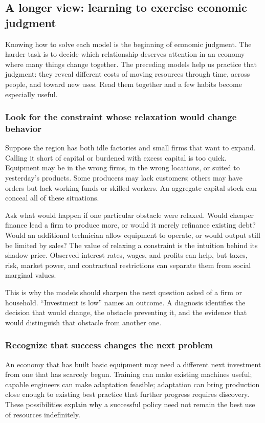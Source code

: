 \subsection{A longer view: learning to exercise economic judgment}
\label{sec:growth-judgment}

Knowing how to solve each model is the beginning of economic judgment.
The harder task is to decide which relationship deserves attention in an
economy where many things change together. The preceding models help us
practice that judgment: they reveal different costs of moving resources
through time, across people, and toward new uses. Read them together and
a few habits become especially useful.

\subsubsection{Look for the constraint whose relaxation would change behavior}

Suppose the region has both idle factories and small firms that want to
expand. Calling it short of capital or burdened with excess capital is too
quick. Equipment may be in the wrong firms, in the wrong locations, or
suited to yesterday's products. Some producers may lack customers; others
may have orders but lack working funds or skilled workers. An aggregate
capital stock can conceal all of these situations.

Ask what would happen if one particular obstacle were relaxed. Would
cheaper finance lead a firm to produce more, or would it merely refinance
existing debt? Would an additional technician allow equipment to operate,
or would output still be limited by sales? The value of relaxing a constraint
is the intuition behind its shadow price. Observed interest rates, wages,
and profits can help, but taxes, risk, market power, and contractual
restrictions can separate them from social marginal values.

This is why the models should sharpen the next question asked of a firm
or household. ``Investment is low'' names an outcome. A diagnosis identifies
the decision that would change, the obstacle preventing it, and the evidence
that would distinguish that obstacle from another one.

\subsubsection{Recognize that success changes the next problem}

An economy that has built basic equipment may need a different next
investment from one that has scarcely begun. Training can make existing
machines useful; capable engineers can make adaptation feasible; adaptation
can bring production close enough to existing best practice that further
progress requires discovery. These possibilities explain why a successful
policy need not remain the best use of resources indefinitely.

